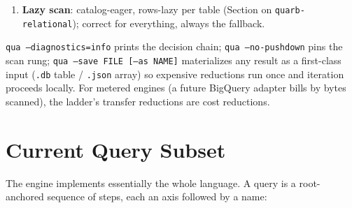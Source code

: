 \documentclass{report}
\begin{document}
\begin{enumerate}
    by the re-run, and a server-rejected prefilter surfaces
    through an eager prefetch and falls back to the scan
    rather than answering empty. A regex match
    (\texttt{== (/\ldots/)}) is narrowed the same way: the
    literals no match can do without
    (\texttt{required\_literals}, from the regex crate's own
    parse: a literal of a concatenation, of a group, of a
    repetition that runs at least once; nothing from an
    alternation, a class, an optional part or a letter under
    \texttt{(?i)}) become substring tests on a text column,
    \texttt{instr} on SQLite and MySQL (whose collation makes it
    keep more, never less), \texttt{LIKE} on PostgreSQL and
    \texttt{strpos} under no dialect (DuckDB's, BigQuery's and
    Athena's doors), and the engine runs the regex over what is
    fetched. DuckDB's door takes a partial plan like the others
    (\texttt{DuckdbAdapter::open\_filtered}). In the
    ladder a conjunction keeps whichever side narrows, a
    disjunction is narrowed only when both sides are, a negation
    never. Full JSON string-equality
    pushdown carries the dialect's validity guard
    (\texttt{json\_valid} and kin) and refuses
    numeric-looking literals (Quarb's \texttt{value\_eq}
    coerces those numerically; no extractor matches that).
    Measured: unpushable grouping over a 1\%-selective filter,
    2.31\,s vs.\ 0.081\,s; JSON numeric compare over 200k
    rows, 1.46\,s scanned vs.\ 0.25\,s prefiltered.
  \item \textbf{Lazy scan}: catalog-eager, rows-lazy per table
    (Section on \texttt{quarb-relational}); correct for
    everything, always the fallback.
\end{enumerate}

\noindent
\texttt{qua --diagnostics=info} prints the decision chain; \texttt{qua
--no-pushdown} pins the scan rung; \texttt{qua --save FILE
[--as NAME]} materializes any result as a first-class input
(\texttt{.db} table / \texttt{.json} array) so expensive
reductions run once and iteration proceeds locally. For metered
engines (a future BigQuery adapter bills by bytes scanned), the
ladder's transfer reductions are cost reductions.

\section{Current Query Subset}

The engine implements essentially the whole language. A query is a
root-anchored sequence of steps, each an axis followed by a name:
\end{document}

